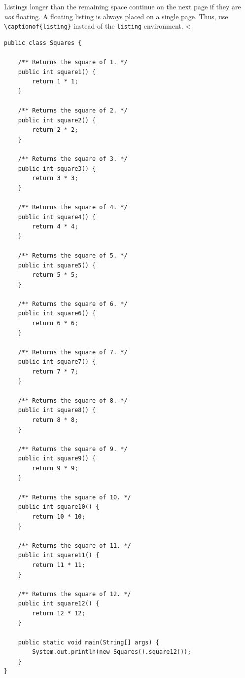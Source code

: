 Listings longer than the remaining space continue on the next page if they are \emph{not} floating.
A floating listing is always placed on a single page.
Thus, use \verb+\captionof{listing}+ instead of the \verb+listing+ environment.
<%

\begin{verbatim}
public class Squares {

    /** Returns the square of 1. */
    public int square1() {
        return 1 * 1;
    }

    /** Returns the square of 2. */
    public int square2() {
        return 2 * 2;
    }

    /** Returns the square of 3. */
    public int square3() {
        return 3 * 3;
    }

    /** Returns the square of 4. */
    public int square4() {
        return 4 * 4;
    }

    /** Returns the square of 5. */
    public int square5() {
        return 5 * 5;
    }

    /** Returns the square of 6. */
    public int square6() {
        return 6 * 6;
    }

    /** Returns the square of 7. */
    public int square7() {
        return 7 * 7;
    }

    /** Returns the square of 8. */
    public int square8() {
        return 8 * 8;
    }

    /** Returns the square of 9. */
    public int square9() {
        return 9 * 9;
    }

    /** Returns the square of 10. */
    public int square10() {
        return 10 * 10;
    }

    /** Returns the square of 11. */
    public int square11() {
        return 11 * 11;
    }

    /** Returns the square of 12. */
    public int square12() {
        return 12 * 12;
    }

    public static void main(String[] args) {
        System.out.println(new Squares().square12());
    }
}
\end{verbatim}
\label{lst:long}
